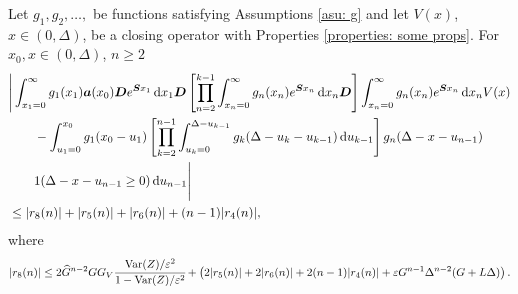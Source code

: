 \begin{cor} \label{cor: aaaaa}
	Let \(g_1,g_2,\dots,\) be functions satisfying Assumptions \ref{asu: g} and let \(V(x)\), \(x\in(0,\Delta)\), be a closing operator with Properties \ref{properties: some props}. For \(x_0,x\in(0,\Delta)\), \(n\geq 2\)
	\begin{align}
		&\Bigg| \int_{x_1=0}^\infty g_1(x_1) \boldsymbol a (x_0) \boldsymbol D e^{\boldsymbol{S}x_1}\, \mathrm{d} x_1\boldsymbol D 
            	\left[\prod_{n=2}^{k-1}\int_{x_n=0}^\infty g_n(x_n) e^{\boldsymbol{S}x_n} \, \mathrm{d} x_n
		\boldsymbol D\right]
            	\int_{x_n=0}^\infty g_{n}(x_n) e^{\boldsymbol{S}x_n} \, \mathrm{d} x_n V(x) \nonumber 
		\\&\qquad {}- \int_{u_1=0}^{x_0}g_1(x_0 - u_1)
		\left[\prod_{k=2}^{n-1} \int_{u_k=0}^{\Delta-u_{k-1}} g_k(\Delta-u_k-u_{k-1})\, \mathrm{d} u_{k-1}\right] \nonumber 
            	g_{n}(\Delta - x-u_{n-1})
	\\&\qquad{} 1(\Delta-x-u_{n-1}\geq0)\, \mathrm{d} u_{n-1} \Bigg| \nonumber
		\\&\leq |r_8(n)|+|r_5(n)|+|r_6(n)| + (n-1)|r_4(n)|,\label{eqn: KAFnn}
	\end{align}
	where 
	\[|r_8(n)|\leq 2\widehat G^{n-2}GG_V\cfrac{\mathrm{Var}(Z)/\varepsilon^2}{1-\mathrm{Var}(Z)/\varepsilon^2}
		+ \left( 2|r_5(n)| + 2|r_6(n)| + 2(n-1)|r_4(n)| + \varepsilon G^{n-1}\Delta^{n-2}(G+L\Delta) \right) .\]
\end{cor}
